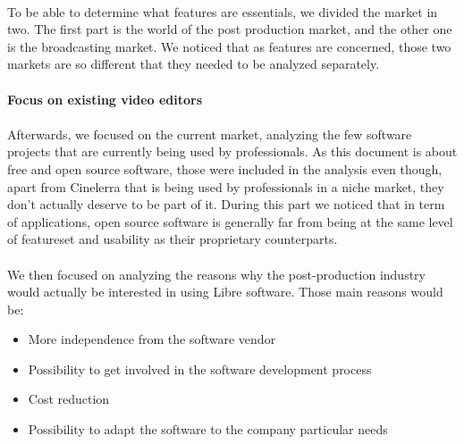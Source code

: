\paragraph{}

To be able to determine what features are essentials, we divided the
market in two. The first part is the world of the post production market,
and the other one is the broadcasting market. We noticed that as features
are concerned, those two markets are so different that they needed to
be analyzed separately.

\paragraph{Focus on existing video editors}

\paragraph{}

Afterwards, we focused on the current market, analyzing the few software
projects that are currently being used by professionals. As this
document is about free and open source software, those were included
in the analysis even though, apart from Cinelerra that is being used
by professionals in a niche market, they don't actually deserve to be
part of it. During this part we noticed that in term of applications,
open source software is generally far from being at the same level of
featureset and usability as their proprietary counterparts.

\paragraph{}

We then focused on analyzing the reasons why the post-production industry
would actually be interested in using Libre software. Those main reasons
would be:

\begin{itemize}

  \item {More independence from the software vendor}

  \item {Possibility to get involved in the software development
  process}

   \item {Cost reduction}

   \item {Possibility to adapt the software to the company particular
   needs}

\end{itemize}


